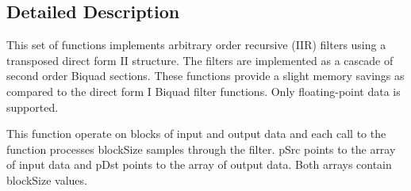 \subsection{Detailed Description}
This set of functions implements arbitrary order recursive (I\-I\-R) filters using a transposed direct form I\-I structure. The filters are implemented as a cascade of second order Biquad sections. These functions provide a slight memory savings as compared to the direct form I Biquad filter functions. Only floating-\/point data is supported.

This function operate on blocks of input and output data and each call to the function processes {\ttfamily block\-Size} samples through the filter. {\ttfamily p\-Src} points to the array of input data and {\ttfamily p\-Dst} points to the array of output data. Both arrays contain {\ttfamily block\-Size} values.

